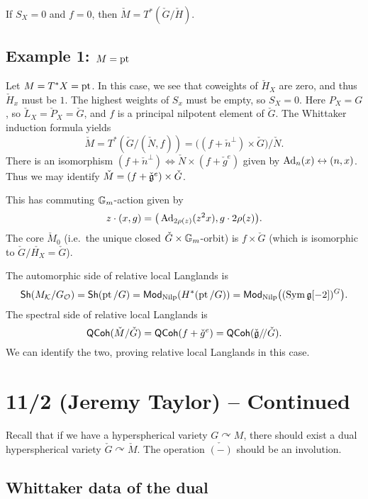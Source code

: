 \documentclass{article}
\begin{document}
\begin{ex}
	If $S_X = 0$ and $f = 0$, then $\check{M} = T^*(\check{G} / \check{H})$.
\end{ex}

\subsection{Example 1: $M = \operatorname{pt}$}

\begin{ex}
	Let $M = T^*X = \operatorname{pt}$.
	In this case, we see that coweights of $\check{H}_X$ are zero, and thus $\check{H}_x$ must be $1$.
	The highest weights of $S_x$ must be empty, so $S_X = 0$.
	Here $P_X = G$, so $\check{L}_X = \check{P}_X = \check{G}$, and $f$ is a principal nilpotent element of $\check{G}$.
	The Whittaker induction formula yields 
	\[
		\check{M} = T^*(\check{G} / (\check{N}, f)) = \big((f + \check{n}^\perp) \times \check{G}\big) / \check{N}.
	\]
	There is an isomorphism $(f + \check{n}^\perp) \Leftrightarrow \check{N} \times (f + \check{g}^e)$ given by $\operatorname{Ad}_n(x) \leftrightarrow (n, x)$.
	Thus we may identify $\check{M} = (f + \check{\mathfrak{g}}^e) \times \check{G}$.

	This has commuting $\mathbb{G}_m$-action given by
	\[
		z \cdot (x, g) = \big(\operatorname{Ad}_{2\rho(z)}(z^2 x), g \cdot 2\rho(z)\big).
	\]
	The core $\check{M}_0$ (i.e.\ the unique closed $\check{G} \times \mathbb{G}_m$-orbit) is $f \times \check{G}$ (which is isomorphic to $\check{G} / \check{H_X} = \check{G}$).

	The automorphic side of relative local Langlands is 
	\[
		\mathsf{Sh}(M_{\mathcal{K}} / G_{\mathcal{O}}) = \mathsf{Sh}(\operatorname{pt} / G) = \mathsf{Mod}_{\mathrm{Nilp}}(H^*(\operatorname{pt} / G)) = \mathsf{Mod}_{\mathrm{Nilp}}\big((\operatorname{Sym} \mathfrak{g}[-2])^G\big).
	\]
	The spectral side of relative local Langlands is
	\[
		\mathsf{QCoh}(\check{M} / \check{G}) = \mathsf{QCoh}(f + \check{g}^e) = \mathsf{QCoh}(\check{\mathfrak{g}} /\mkern-3mu/ \check{G}).
	\]
	We can identify the two, proving relative local Langlands in this case.
\end{ex}

\section{11/2 (Jeremy Taylor) -- Continued}

Recall that if we have a hyperspherical variety $G \curvearrowright M$, there should exist a dual hyperspherical variety $\check{G} \curvearrowright \check{M}$.
The operation $\check{(-)}$ should be an involution.

\subsection{Whittaker data of the dual}
\end{document}
